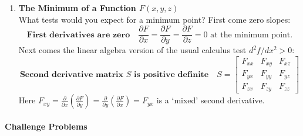 \documentclass[14pt, a4paper]{article}
\begin{document}
\begin{enumerate}[resume]
    \item \textbf{The Minimum of a Function $F(x, y, z)$} \\
          What tests would you expect for a minimum point? First come zero slopes:
          \[
              \textbf{First derivatives are zero} \quad \frac{\partial F}{\partial x} = \frac{\partial F}{\partial y} = \frac{\partial F}{\partial z} = 0 \text{ at the minimum point.}
          \]
          Next comes the linear algebra version of the usual calculus test $d^2f/dx^2 > 0$:
          \[
              \textbf{Second derivative matrix } S \textbf{ is positive definite} \quad S = \begin{bmatrix} F_{xx} & F_{xy} & F_{xz} \\ F_{yx} & F_{yy} & F_{yz} \\ F_{zx} & F_{zy} & F_{zz} \end{bmatrix}
          \]
          Here $F_{xy} = \frac{\partial}{\partial x}\left(\frac{\partial F}{\partial y}\right) = \frac{\partial}{\partial y}\left(\frac{\partial F}{\partial x}\right) = F_{yx}$ is a `mixed' second derivative.
\end{enumerate}

\paragraph{Challenge Problems}
\end{document}
